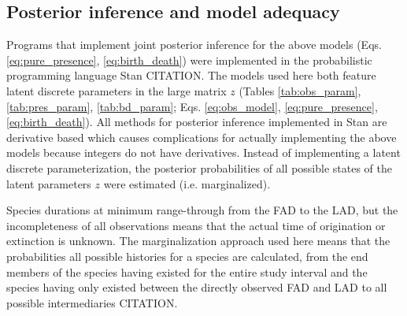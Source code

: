 \documentclass[12pt,letterpaper]{article}
\begin{document}


\subsection*{Posterior inference and model adequacy}
Programs that implement joint posterior inference for the above models (Eqs. \ref{eq:pure_presence}, \ref{eq:birth_death}) were implemented in the probabilistic programming language Stan CITATION. The models used here both feature latent discrete parameters in the large matrix \(z\) (Tables \ref{tab:obs_param}, \ref{tab:pres_param}, \ref{tab:bd_param}; Eqs. \ref{eq:obs_model}, \ref{eq:pure_presence}, \ref{eq:birth_death}). All methods for posterior inference implemented in Stan are derivative based which causes complications for actually implementing the above models because integers do not have derivatives. Instead of implementing a latent discrete parameterization, the posterior probabilities of all possible states of the latent parameters \(z\) were estimated (i.e. marginalized). 

Species durations at minimum range-through from the FAD to the LAD, but the incompleteness of all observations means that the actual time of origination or extinction is unknown. The marginalization approach used here means that the probabilities all possible histories for a species are calculated, from the end members of the species having existed for the entire study interval and the species having only existed between the directly observed FAD and LAD to all possible intermediaries CITATION. %
\end{document}
